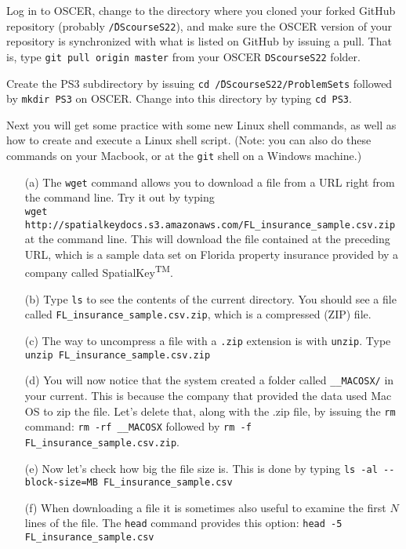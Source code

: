 \documentclass[12pt,english]{exam}
\begin{document}
\begin{questions}
\question Log in to OSCER, change to the directory where you cloned your forked GitHub repository (probably \texttt{\~/DScourseS22}), and make sure the OSCER version of your repository is synchronized with what is listed on GitHub by issuing a pull. That is, type \texttt{git pull origin master} from your OSCER \texttt{DScourseS22} folder. 

\question Create the PS3 subdirectory by issuing \texttt{cd \~/DScourseS22/ProblemSets} followed by \texttt{mkdir PS3} on OSCER. Change into this directory by typing \texttt{cd PS3}.

\question Next you will get some practice with some new Linux shell commands, as well as how to create and execute a Linux shell script. (Note: you can also do these commands on your Macbook, or at the \texttt{git} shell on a Windows machine.)
\begin{itemize}
	\item[(a)] The \texttt{wget} command allows you to download a file from a URL right from the command line. Try it out by typing\\ \texttt{wget http://spatialkeydocs.s3.amazonaws.com/FL\_insurance\_sample.csv.zip} at the command line. This will download the file contained at the preceding URL, which is a sample data set on Florida property insurance provided by a company called SpatialKey\textsuperscript{TM}.
	\item[(b)] Type \texttt{ls} to see the contents of the current directory. You should see a file called \texttt{FL\_insurance\_sample.csv.zip}, which is a compressed (ZIP) file.
	\item[(c)] The way to uncompress a file with a \texttt{.zip} extension is with \texttt{unzip}. Type \texttt{unzip FL\_insurance\_sample.csv.zip}
	\item[(d)] You will now notice that the system created a folder called \texttt{\_\_MACOSX/} in your current. This is because the company that provided the data used Mac OS to zip the file. Let's delete that, along with the .zip file, by issuing the \texttt{rm} command: \texttt{rm -rf \_\_MACOSX} followed by \texttt{rm -f FL\_insurance\_sample.csv.zip}. 
	\item[(e)] Now let's check how big the file size is. This is done by typing \texttt{ls -al -{}-block-size=MB FL\_insurance\_sample.csv}
	\item[(f)] When downloading a file it is sometimes also useful to examine the first $N$ lines of the file. The \texttt{head} command provides this option: \texttt{head -5 FL\_insurance\_sample.csv}

\end{itemize}
\end{questions}
\end{document}
